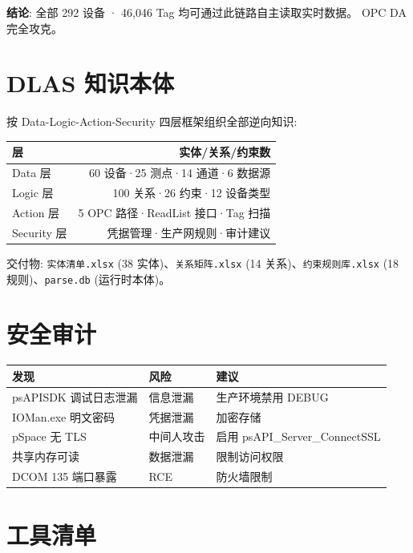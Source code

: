 \documentclass[12pt,a4paper]{ctexart}
\begin{document}
\textbf{结论}: 全部 292 设备 · 46,046 Tag 均可通过此链路自主读取实时数据。
OPC DA 完全攻克。

\section{DLAS 知识本体}

按 Data-Logic-Action-Security 四层框架组织全部逆向知识:

\begin{table}[H]\centering
\begin{tabular}{lr}
\toprule
\textbf{层} & \textbf{实体/关系/约束数} \\
\midrule
Data 层 & 60 设备·25 测点·14 通道·6 数据源 \\
Logic 层 & 100 关系·26 约束·12 设备类型 \\
Action 层 & 5 OPC 路径·ReadList 接口·Tag 扫描 \\
Security 层 & 凭据管理·生产网规则·审计建议 \\
\bottomrule
\end{tabular}
\end{table}

交付物: \texttt{实体清单.xlsx} (38 实体)、\texttt{关系矩阵.xlsx} (14 关系)、\texttt{约束规则库.xlsx} (18 规则)、\texttt{parse.db} (运行时本体)。

\section{安全审计}

\begin{table}[H]\centering
\begin{tabular}{lll}
\toprule
\textbf{发现} & \textbf{风险} & \textbf{建议} \\
\midrule
psAPISDK 调试日志泄漏 & 信息泄漏 & 生产环境禁用 DEBUG \\
IOMan.exe 明文密码 & 凭据泄漏 & 加密存储 \\
pSpace 无 TLS & 中间人攻击 & 启用 psAPI\_Server\_ConnectSSL \\
共享内存可读 & 数据泄漏 & 限制访问权限 \\
DCOM 135 端口暴露 & RCE & 防火墙限制 \\
\bottomrule
\end{tabular}
\end{table}

\section{工具清单}
\end{document}
